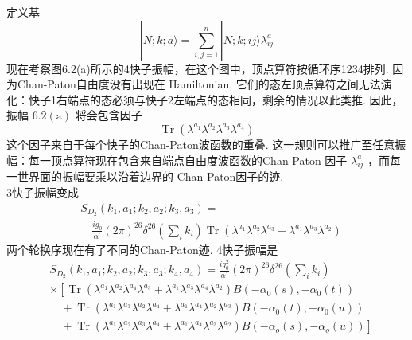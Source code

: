 定义基
\begin{equation}
	|N ; k ; a\rangle=\sum_{i, j=1}^{n}|N ; k ; i j\rangle \lambda_{i j}^{a}
\end{equation}
 现在考察图6.2(a)所示的4快子振幅，在这个图中，顶点算符按循环序1234排列. 因为Chan-Paton自由度没有出现在 Hamiltonian, 它们的态左顶点算符之间无法演化：快子1右端点的态必须与快子2左端点的态相同，剩余的情况以此类推. 因此，振幅 $6.2(\mathrm{a})$ 将会包含因子
\begin{equation}
	\operatorname{Tr}\left(\lambda^{a_{1}} \lambda^{a_{2}} \lambda^{a_{3}} \lambda^{a_{4}}\right)
\end{equation}
这个因子来自于每个快子的Chan-Paton波函数的重叠. 这一规则可以推广至任意振幅：每一顶点算符现在包含来自端点自由度波函数的Chan-Paton 因子 $\lambda_{i j}^{a}$ ，而每一世界面的振幅要乘以沿着边界的 Chan-Paton因子的迹.\\
3快子振幅变成
\begin{equation}
	\begin{aligned}
		&S_{D_{2}}\left(k_{1}, a_{1} ; k_{2}, a_{2} ; k_{3}, a_{3}\right)= \\
		&\quad \frac{i g_{0}}{\alpha^{\prime}}(2 \pi)^{26} \delta^{26}\left(\sum_{i} k_{i}\right) \operatorname{Tr}\left(\lambda^{a_{1}} \lambda^{a_{2}} \lambda^{a_{3}}+\lambda^{a_{1}} \lambda^{a_{3}} \lambda^{a_{2}}\right)
	\end{aligned}
\end{equation}
两个轮换序现在有了不同的Chan-Paton迹. 4快子振幅是
\begin{equation}
	\begin{aligned}
		&S_{D_{2}}\left(k_{1}, a_{1} ; k_{2}, a_{2} ; k_{3}, a_{3} ; k_{4}, a_{4}\right)=\frac{i g_{0}^{2}}{\alpha^{\prime}}(2 \pi)^{26} \delta^{26}\left(\sum_{i} k_{i}\right) \\
		&\times\left[\operatorname{Tr}\left(\lambda^{a_{1}} \lambda^{a_{2}} \lambda^{a_{4}} \lambda^{a_{3}}+\lambda^{a_{1}} \lambda^{a_{3}} \lambda^{a_{4}} \lambda^{a_{2}}\right) B\left(-\alpha_{0}(s),-\alpha_{0}(t)\right)\right. \\
		&\quad+\operatorname{Tr}\left(\lambda^{a_{1}} \lambda^{a_{3}} \lambda^{a_{2}} \lambda^{a_{4}}+\lambda^{a_{1}} \lambda^{a_{4}} \lambda^{a_{2}} \lambda^{a_{3}}\right) B\left(-\alpha_{0}(t),-\alpha_{0}(u)\right) \\
		&\left.\quad+\operatorname{Tr}\left(\lambda^{a_{1}} \lambda^{a_{2}} \lambda^{a_{3}} \lambda^{a_{4}}+\lambda^{a_{1}} \lambda^{a_{4}} \lambda^{a_{3}} \lambda^{a_{2}}\right) B\left(-\alpha_{o}(s),-\alpha_{o}(u)\right)\right]
	\end{aligned}
\end{equation}
